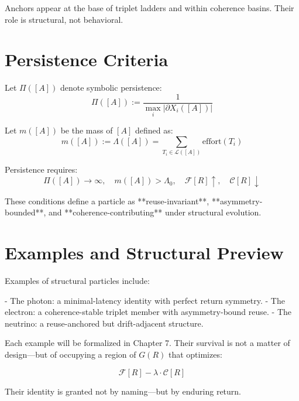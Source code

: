 Anchors appear at the base of triplet ladders and within coherence basins. Their role is structural, not behavioral.

\section{Persistence Criteria} \label{sec:persistence-criteria}

Let $\Pi([A])$ denote symbolic persistence:
\[
\Pi([A]) := \frac{1}{\max_i |\partial X_i([A])|}
\]

Let $m([A])$ be the mass of $[A]$ defined as:
\[
m([A]) := \Lambda([A]) = \sum_{T_i \in \mathcal{L}([A])} \text{effort}(T_i)
\]

Persistence requires:
\[
\Pi([A]) \to \infty,\quad m([A]) > \Lambda_0,\quad \mathcal{F}[R] \uparrow,\quad \mathcal{C}[R] \downarrow
\]

These conditions define a particle as **reuse-invariant**, **asymmetry-bounded**, and **coherence-contributing** under structural evolution.

\section{Examples and Structural Preview} \label{sec:particle-preview}

Examples of structural particles include:

- The photon: a minimal-latency identity with perfect return symmetry.
- The electron: a coherence-stable triplet member with asymmetry-bound reuse.
- The neutrino: a reuse-anchored but drift-adjacent structure.

Each example will be formalized in Chapter 7. Their survival is not a matter of design—but of occupying a region of $G(R)$ that optimizes:

\[
\mathcal{F}[R] - \lambda \cdot \mathcal{C}[R]
\]

Their identity is granted not by naming—but by enduring return.
